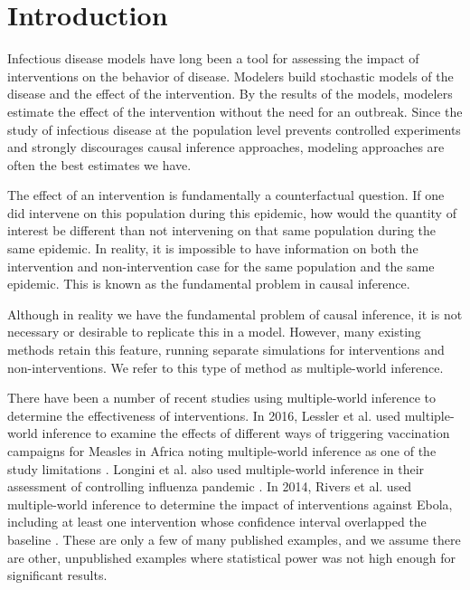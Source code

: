 \documentclass[openacc]{rsproca_new}%
\begin{document}

\maketitle


\section{Introduction}

Infectious disease models have long been a tool for assessing the impact of interventions on the behavior of disease.
Modelers build stochastic models of the disease and the effect of the intervention.
By the results of the models, modelers estimate the effect of the intervention without the need for an outbreak.
Since the study of infectious disease at the population level prevents controlled experiments and strongly discourages causal inference approaches, modeling approaches are often the best estimates we have.

The effect of an intervention is fundamentally a counterfactual question.
If one did intervene on this population during this epidemic, how would the quantity of interest be different than not intervening on that same population during the same epidemic.
In reality, it is impossible to have information on both the intervention and non-intervention case for the same population and the same epidemic.
This is known as the fundamental problem in causal inference.\cite{holland:1986}

Although in reality we have the fundamental problem of causal inference, it is not necessary or desirable to replicate this in a model. 
However, many existing methods retain this feature, running separate simulations for interventions and non-interventions.
We refer to this type of method as multiple-world inference.

There have been a number of recent studies using multiple-world inference to determine the effectiveness of interventions.
In 2016, Lessler et al. used multiple-world inference to examine the effects of different ways of triggering vaccination campaigns for Measles in Africa noting multiple-world inference as one of the study limitations \cite{lessler-et-al:2016}.
Longini et al. also used multiple-world inference in their assessment of controlling influenza pandemic \cite{longini-et-al:2005}.
In 2014, Rivers et al. used multiple-world inference to determine the impact of interventions against Ebola, including at least one intervention whose confidence interval overlapped the baseline \cite{rivers-et-al:2014}.
These are only a few of many published examples, and we assume there are other, unpublished examples where statistical power was not high enough for significant results.
\end{document}
